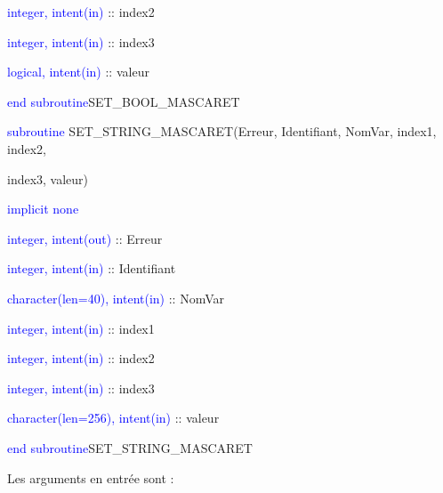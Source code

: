 \documentclass[a4paper,11pt]{article}
\begin{document}
        \hspace{1cm} \textcolor{blue}{integer, intent(in)}  :: index2
        
        \hspace{1cm} \textcolor{blue}{integer, intent(in)}  :: index3
        
        \hspace{1cm} \textcolor{blue}{logical, intent(in)}  :: valeur
        
    \textcolor{blue}{end subroutine}SET\_BOOL\_MASCARET

 \vspace{0.5cm}
 
 \vspace{0.5cm}
 
    \textcolor{blue}{subroutine} SET\_STRING\_MASCARET(Erreur, Identifiant, NomVar, index1, index2,
    
     index3, valeur)
    
        \hspace{1cm}\textcolor{blue}{implicit none}                 
        
        \hspace{1cm} \textcolor{blue}{integer, intent(out)} :: Erreur
        
        \hspace{1cm} \textcolor{blue}{integer, intent(in)}  :: Identifiant
        
        \hspace{1cm} \textcolor{blue}{character(len=40), intent(in)}  :: NomVar
        
        \hspace{1cm} \textcolor{blue}{integer, intent(in)}  :: index1
        
        \hspace{1cm} \textcolor{blue}{integer, intent(in)}  :: index2
        
        \hspace{1cm} \textcolor{blue}{integer, intent(in)}  :: index3
        
        \hspace{1cm} \textcolor{blue}{character(len=256), intent(in)}  :: valeur
        
    \textcolor{blue}{end subroutine}SET\_STRING\_MASCARET

 \vspace{0.5cm}
 
 Les arguments en entr\'ee sont :
 
 \vspace{0.5cm}
 
\end{document}
